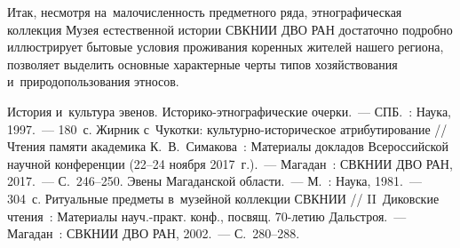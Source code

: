 Итак, несмотря на~малочисленность предметного ряда, этнографическая коллекция Музея естественной истории СВКНИИ ДВО РАН достаточно подробно иллюстрирует бытовые условия проживания коренных жителей нашего региона, позволяет выделить основные характерные черты типов хозяйствования и~природопользования этносов.

\begin{thebibliography}{99}
\bibitem{}История и~культура эвенов. Историко-этнографические очерки.~--- СПБ.~: Наука, 1997.~--- 180~с.
\bibitem{} Жирник с~Чукотки: культурно-историческое атрибутирование // Чтения памяти академика К.~В.~Симакова~: Материалы докладов Всероссийской научной конференции (22--24 ноября 2017~г.).~--- Магадан~: СВКНИИ ДВО РАН, 2017.~--- С.~246--250.
\bibitem{} Эвены Магаданской области.~--- М.~: Наука, 1981.~--- 304~с.
\bibitem{} Ритуальные предметы в~музейной коллекции СВКНИИ // II~Диковские чтения~: Материалы науч.-практ. конф., посвящ. 70-летию Дальстроя.~--- Магадан~: СВКНИИ ДВО РАН, 2002.~--- С.~280--288.

\end{thebibliography}
